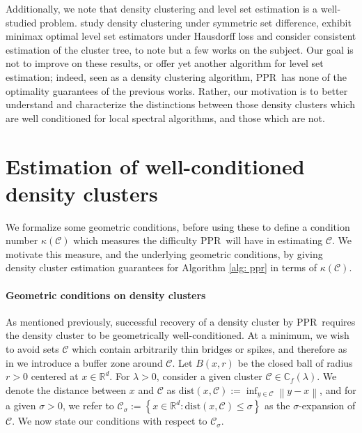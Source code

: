 \documentclass{article}
\newcommand{\set}[1]{\left\{#1\right\}}
\newcommand{\Reals}{\mathbb{R}}
\newcommand{\Rd}{\Reals^d}
\newcommand{\norm}[1]{\left\lVert#1\right\rVert}
\newcommand{\1}{\mathbf{1}}
\newcommand{\dist}{\mathrm{dist}}
\newcommand{\Cbb}{\mathbb{C}}
\newcommand{\Cset}{\mathcal{C}}
\newcommand{\Csig}{\Cset_{\sigma}}
\newcommand{\pprspace}{{\sc PPR~}}
\theoremstyle{aldenthm}
\theoremstyle{aldenrmrk}
\begin{document}
Additionally, we note that density clustering and level set estimation is a well-studied problem. \citep{polonik1995, rigollet2009} study density clustering under symmetric set difference, \citep{tsybakov1997, singh2009} exhibit minimax optimal level set estimators under Hausdorff loss and \citep{hartigan1981, chaudhuri2010} consider consistent estimation of the cluster tree, to note but a few works on the subject. Our goal is not to improve on these results, or offer yet another algorithm for level set estimation; indeed, seen as a density clustering algorithm, \pprspace has none of the optimality guarantees of the previous works. Rather, our motivation is to better understand and characterize the distinctions between those density clusters which are well conditioned for local spectral algorithms, and those which are not.

\section{Estimation of well-conditioned density clusters}
\label{sec: consistent_cluster_estimation_with_ppr}

We formalize some geometric conditions, before using these to define a condition number $\kappa(\Cset)$ which measures the difficulty \pprspace will have in estimating $\Cset$. We motivate this measure, and the underlying geometric conditions, by giving density cluster estimation guarantees for Algorithm \ref{alg: ppr} in terms of $\kappa(\Cset)$.

\paragraph{Geometric conditions on density clusters}

As mentioned previously, successful recovery of a density cluster by \pprspace requires the density cluster to be geometrically well-conditioned. At a minimum, we wish to avoid sets $\Cset$ which contain arbitrarily thin bridges or spikes, and therefore as in \cite{chaudhuri2010} we introduce a buffer zone around $\Cset$. Let $B(x,r)$ be the closed ball of radius $r > 0$ centered at $x \in \Rd$. For $\lambda > 0$, consider a given cluster $\Cset \in \Cbb_f(\lambda)$. We denote the distance between $x$ and $\Cset$ as $\dist(x,\Cset) := \inf_{y \in \Cset} \norm{y - x}$, and for a given $\sigma > 0$, we refer to $\Csig := \set{x \in \Reals^d: \dist(x,\Cset) \leq \sigma}$ as the $\sigma$-expansion of $\Cset$. We now state our conditions with respect to $\Csig$.
\end{document}
